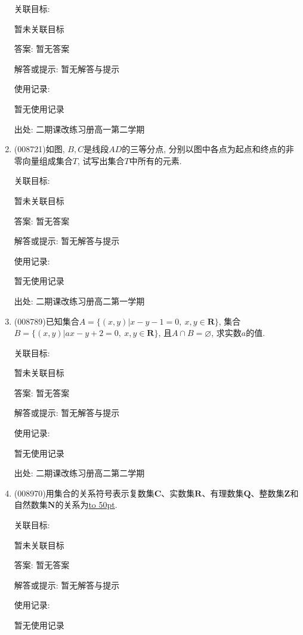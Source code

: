 \documentclass[10pt,a4paper]{article}
\newcommand{\blank}[1]{\underline{\hbox to #1pt{}}}
\begin{document}
\begin{enumerate}[1.]
关联目标:

暂未关联目标

答案: 暂无答案

解答或提示: 暂无解答与提示

使用记录:

暂无使用记录


出处: 二期课改练习册高一第二学期
\item { (008721)}如图, $B,C$是线段$AD$的三等分点, 分别以图中各点为起点和终点的非零向量组成集合$T$, 试写出集合$T$中所有的元素.
\begin{center}
\end{center}


关联目标:

暂未关联目标

答案: 暂无答案

解答或提示: 暂无解答与提示

使用记录:

暂无使用记录


出处: 二期课改练习册高二第一学期
\item { (008789)}已知集合$A=\{(x,y)|x-y-1=0,\ x,y\in \mathbf{R}\}$, 集合$B=\{(x,y)|ax-y+2=0,\ x,y\in \mathbf{R}\}$, 且$A\cap B=\varnothing$, 求实数$a$的值.


关联目标:

暂未关联目标

答案: 暂无答案

解答或提示: 暂无解答与提示

使用记录:

暂无使用记录


出处: 二期课改练习册高二第二学期
\item { (008970)}用集合的关系符号表示复数集$\mathbf{C}$、实数集$\mathbf{R}$、有理数集$\mathbf{Q}$、整数集$\mathbf{Z}$和自然数集$\mathbf{N}$的关系为\blank{50}.


关联目标:

暂未关联目标

答案: 暂无答案

解答或提示: 暂无解答与提示

使用记录:

暂无使用记录



\end{enumerate}
\end{document}
